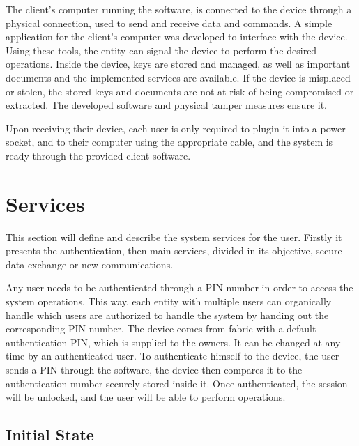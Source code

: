 The client's computer running the software, is connected to the device through a physical connection, used to send and receive data and commands. A simple application for the client's computer was developed to interface with the device.
Using these tools, the entity can signal the device to perform the desired operations.
Inside the device, keys are stored and managed, as well as important documents and the implemented services are available.
If the device is misplaced or stolen, the stored keys and documents are not at risk of being compromised or extracted. The developed software and physical tamper measures ensure it.

Upon receiving their device, each user is only required to plugin it into a power socket, and to their computer using the appropriate cable, and the system is ready through the provided client software.

\section{Services}\label{chap:arch:services}

This section will define and describe the system services for the user.
Firstly it presents the authentication, then main services, divided in its objective, secure data exchange or new communications.

Any user needs to be authenticated through a \ac{PIN} number in order to access the system operations. This way, each entity with multiple users can organically handle which users are authorized to handle the system by handing out the corresponding \ac{PIN} number.
The device comes from fabric with a default authentication \ac{PIN}, which is supplied to the owners. It can be changed at any time by an authenticated user.
To authenticate himself to the device, the user sends a \ac{PIN} through the software, the device then compares it to the authentication number securely stored inside it. Once authenticated, the session will be unlocked, and the user will be able to perform operations.

\subsection{Initial State}\label{chap:arch:services:initial-state}

